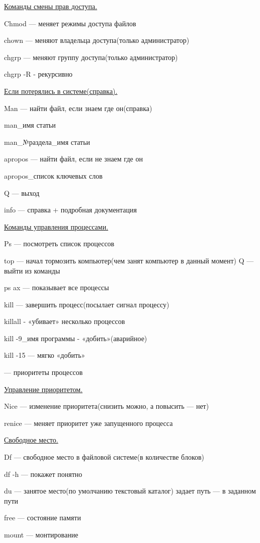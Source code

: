 \par 
\underline{Команды смены прав доступа.}
\par 
Chmod — меняет режимы доступа файлов
\par 
chown — меняют владельца доступа(только
администратор)
\par 
chgrp — меняют группу доступа(только
администратор)
\par 
chgrp -R - рекурсивно

\par 
\underline{Если потерялись в системе(справка).}
\par 
Man — найти файл, если знаем где он(справка)
\par 
man\_имя статьи
\par 
man\_№раздела\_имя статьи
\par 
apropos — найти файл, если не знаем где он
\par 
apropos\_список ключевых слов
\par 
Q — выход
\par 
info — справка + подробная документация

\par 
\underline{Команды управления процессами.}
\par 
Ps — посмотреть список процессов
\par 
top — начал тормозить компьютер(чем занят
компьютер в данный момент) Q — выйти из
команды
\par 
ps ax — показывает все процессы
\par 
kill — завершить процесс(посылает сигнал
процессу)
\par 
killall - «убивает» несколько процессов
\par 
kill -9\_имя программы - «добить»(аварийное)
\par 
kill -15 — мягко «добить»
\par 
[-20 — 19] — приоритеты процессов

\par 
\underline{Управление приоритетом.}
\par 
Nice — изменение приоритета(снизить
можно, а повысить — нет)
\par 
renice — меняет приоритет уже запущенного
процесса

\par 
\underline{Свободное место.}
\par 
Df — свободное место в файловой системе(в
количестве блоков)
\par 
df -h — покажет понятно
\par 
du — занятое место(по умолчанию текстовый
каталог) задает путь — в заданном пути
\par 
free — состояние памяти
\par 
mount — монтирование 

